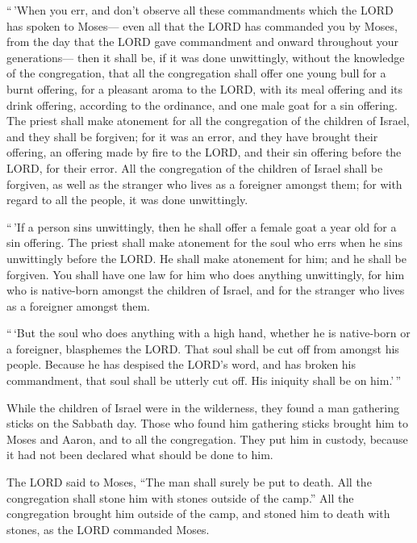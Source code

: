  ``\,'When you err, and don't observe all these
commandments which the LORD has spoken to Moses---  even
all that the LORD has commanded you by Moses, from the day that the LORD
gave commandment and onward throughout your generations---
 then it shall be, if it was done unwittingly, without
the knowledge of the congregation, that all the congregation shall offer
one young bull for a burnt offering, for a pleasant aroma to the LORD,
with its meal offering and its drink offering, according to the
ordinance, and one male goat for a sin offering.  The
priest shall make atonement for all the congregation of the children of
Israel, and they shall be forgiven; for it was an error, and they have
brought their offering, an offering made by fire to the LORD, and their
sin offering before the LORD, for their error.  All the
congregation of the children of Israel shall be forgiven, as well as the
stranger who lives as a foreigner amongst them; for with regard to all
the people, it was done unwittingly.

 ``\,'If a person sins unwittingly, then he shall offer a
female goat a year old for a sin offering.  The priest
shall make atonement for the soul who errs when he sins unwittingly
before the LORD. He shall make atonement for him; and he shall be
forgiven.  You shall have one law for him who does
anything unwittingly, for him who is native-born amongst the children of
Israel, and for the stranger who lives as a foreigner amongst them.

 ``\,`But the soul who does anything with a high hand,
whether he is native-born or a foreigner, blasphemes the LORD. That soul
shall be cut off from amongst his people.  Because he has
despised the LORD's word, and has broken his commandment, that soul
shall be utterly cut off. His iniquity shall be on him.'\,''

 While the children of Israel were in the wilderness,
they found a man gathering sticks on the Sabbath day. 
Those who found him gathering sticks brought him to Moses and Aaron, and
to all the congregation.  They put him in custody,
because it had not been declared what should be done to him.

 The LORD said to Moses, ``The man shall surely be put to
death. All the congregation shall stone him with stones outside of the
camp.''  All the congregation brought him outside of the
camp, and stoned him to death with stones, as the LORD commanded Moses.

